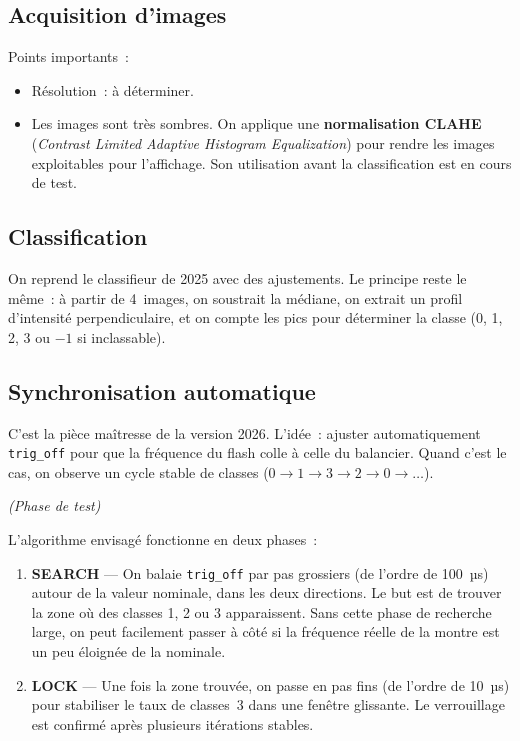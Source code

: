 \documentclass[a4paper,11pt]{article}
\newcommand{\code}[1]{\colorbox{codebg}{\texttt{#1}}}
\begin{document}
\subsection{Acquisition d'images}

Points importants~:

\begin{itemize}
    \item Résolution~: à déterminer.
    \item Les images sont très sombres. On applique une \textbf{normalisation CLAHE} (\emph{Contrast Limited Adaptive Histogram Equalization}) pour rendre les images exploitables pour l'affichage. Son utilisation avant la classification est en cours de test.
\end{itemize}

\subsection{Classification}

On reprend le classifieur de 2025 avec des ajustements. Le principe reste le même~: à partir de 4~images, on soustrait la médiane, on extrait un profil d'intensité perpendiculaire, et on compte les pics pour déterminer la classe (0, 1, 2, 3 ou $-1$ si inclassable).

\subsection{Synchronisation automatique}

C'est la pièce maîtresse de la version 2026. L'idée~: ajuster automatiquement \code{trig\_off} pour que la fréquence du flash colle à celle du balancier. Quand c'est le cas, on observe un cycle stable de classes ($0 \to 1 \to 3 \to 2 \to 0 \to \ldots$).

\medskip
\noindent\textit{(Phase de test)}

\medskip
L'algorithme envisagé fonctionne en deux phases~:

\begin{enumerate}
    \item \textbf{SEARCH} --- On balaie \code{trig\_off} par pas grossiers (de l'ordre de 100~µs) autour de la valeur nominale, dans les deux directions. Le but est de trouver la zone où des classes 1, 2 ou 3 apparaissent. Sans cette phase de recherche large, on peut facilement passer à côté si la fréquence réelle de la montre est un peu éloignée de la nominale.

    \item \textbf{LOCK} --- Une fois la zone trouvée, on passe en pas fins (de l'ordre de 10~µs) pour stabiliser le taux de classes~3 dans une fenêtre glissante. Le verrouillage est confirmé après plusieurs itérations stables.
\end{enumerate}
\end{document}
